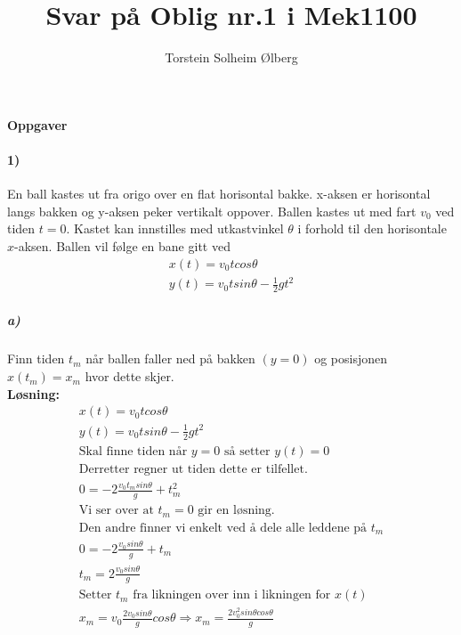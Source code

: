\documentclass[11pt, A4paper,norsk]{article}
\author{Torstein Solheim Ølberg}
\title{Svar på Oblig nr.1 i Mek1100}
\begin{document}
\maketitle
	\begin{center}
\Large \textbf{Oppgaver}
	\end{center}









		\paragraph{1)}
En ball kastes ut fra origo over en flat horisontal bakke. x-aksen er horisontal langs
bakken og y-aksen peker vertikalt oppover. Ballen kastes ut med fart $v_0$ ved tiden
$t = 0$. Kastet kan innstilles med utkastvinkel $\theta$ i forhold til den horisontale $x$-aksen. Ballen vil følge en bane gitt ved
			\begin{align}
x(t) = v_0 t cos\theta \\
y(t) = v_0 t sin\theta - \frac{1}{2} g t^2
			\end{align}










			\subparagraph{a)}
				\begin{flushleft}
Finn tiden $t_m$ når ballen faller ned på bakken $(y = 0)$ og posisjonen $x(t_m) = x_m$
hvor dette skjer. \\
\vspace{1mm}
\textbf{Løsning:}
\vspace{1mm}
					\begin{align}
x(t) = v_0 t cos\theta \nonumber \\
y(t) = v_0 t sin\theta - \frac{1}{2} g t^2 \nonumber \\
\text{Skal finne tiden når $y = 0$ så setter $y(t) = 0$} \nonumber \\
\text{Derretter regner ut tiden dette er tilfellet.} \nonumber \\
0 = -2 \frac{v_0 t_m sin\theta}{g} + t_m^2 \nonumber \\
\text{Vi ser over at $t_m = 0$ gir en løsning.} \nonumber \\
\text{Den andre finner vi enkelt ved å dele alle leddene på $t_m$} \nonumber \\
0 = -2 \frac{v_0 sin\theta}{g} + t_m \nonumber \\
t_m = 2 \frac{v_0 sin\theta}{g} \nonumber \\
\text{Setter $t_m$ fra likningen over inn i likningen for $x(t)$} \nonumber \\
x_m = v_0 \frac{2 v_0 sin\theta}{g} cos\theta \Rightarrow x_m = \frac{2 v_0^2 sin\theta cos\theta}{g} \nonumber
					\end{align}
				\end{flushleft}
\end{document}
